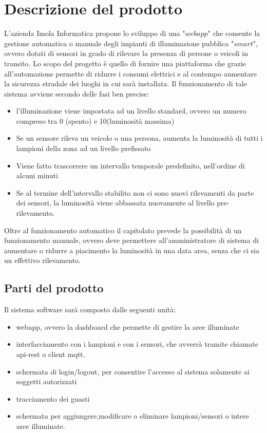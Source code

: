 \documentclass[12pt]{article}
\begin{document}
\section{Descrizione del prodotto}
L'azienda Imola Informatica propone lo sviluppo di una "$webapp$" che consente la gestione automatica o manuale degli impianti di illuminazione pubblica "$smart$", ovvero dotati di sensori in grado di rilevare la presenza di persone o veicoli in transito.
Lo scopo del progetto è quello di fornire una piattaforma che grazie all'automazione permette di ridurre i consumi elettrici e al contempo aumentare la sicurezza stradale dei luoghi in cui sarà installata.
Il funzionamento di tale sistema avviene secondo delle fasi ben precise:
\begin{itemize}
	\item l'illuminazione viene impostata ad un livello standard, ovvero un numero compreso tra 0 (spento) e 10(luminosità massima)
	\item Se un sensore rileva un veicolo o una persona, aumenta la luminosità di tutti i lampioni della zona ad un livello prefissato
	\item Viene fatto trascorrere un intervallo temporale predefinito, nell'ordine di alcuni minuti
	\item Se al termine dell'intervallo stabilito non ci sono nuovi rilevamenti da parte dei sensori, la luminosità viene abbassata nuovamente al livello pre-rilevamento.
\end{itemize}
Oltre al funzionamento automatico il capitolato prevede la possibilità di un funzionamento manuale, ovvero deve permettere all'amministratore di sistema di aumentare o ridurre a piacimento la luminosità in una data area, senza che ci sia un effettivo rilevamento.

\subsection{Parti del prodotto}
Il sistema software sarà composto dalle seguenti unità:
\begin{itemize}
	\item webapp, ovvero la dashboard che permette di gestire la aree illuminate
	\item interfacciamento con i lampioni e con i sensori, che avverrà tramite chiamate api-rest o client mqtt.
	\item schermata di login/logout, per consentire l'accesso al sistema solamente ai soggetti autorizzati
	\item tracciamento dei guasti
	\item schermata per aggiungere,modificare o eliminare lampioni/sensori o intere aree illuminate.
\end{itemize}
\end{document}
